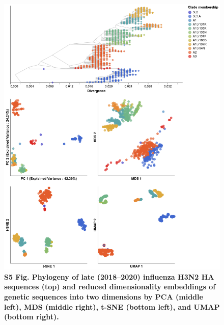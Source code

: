 \documentclass[10pt,letterpaper]{article}
\begin{document}
\begin{figure}[!h]
\includegraphics[width=\columnwidth]{figures/flu-2018-2020-ha-embeddings-by-clade.png}
\caption*{{\bf S5 Fig. Phylogeny of late (2018--2020) influenza H3N2 HA sequences (top) and reduced dimensionality embeddings of genetic sequences into two dimensions by PCA (middle left), MDS (middle right), t-SNE (bottom left), and UMAP (bottom right).}}
\end{figure}
\end{document}
